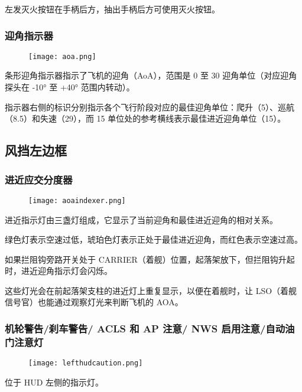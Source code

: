 左发灭火按钮在手柄后方，抽出手柄后方可使用灭火按钮。

\subsubsection{迎角指示器}

\begin{figure}[htb]
  \center
  \texttt{[image: aoa.png]}
\end{figure}
条形迎角指示器指示了飞机的迎角（AoA），范围是 0 至 30 迎角单位（对应迎角探头在 -10° 至 +40° 范围内转动）。

指示器右侧的标识分别指示各个飞行阶段对应的最佳迎角单位：爬升（5）、巡航（8.5）和失速（29），而 15 单位处的参考横线表示最佳进近迎角单位（15）。

\subsection{风挡左边框}

\subsubsection{进近应交分度器}

\begin{figure}[htb]
  \center
  \texttt{[image: aoaindexer.png]}
\end{figure}
进近指示灯由三盏灯组成，它显示了当前迎角和最佳进近迎角的相对关系。

绿色灯表示空速过低，琥珀色灯表示正处于最佳进近迎角，而红色表示空速过高。

如果拦阻钩旁路开关处于 CARRIER（着舰）位置，起落架放下，但拦阻钩升起时，进近迎角指示灯会闪烁。

这些灯光会在前起落架支柱的进近灯上重复显示，以便在着舰时，让 LSO（着舰信号官）也能通过观察灯光来判断飞机的 AOA。

\subsubsection{机轮警告/刹车警告/ ACLS 和 AP 注意/ NWS 启用注意/自动油门注意灯}

\begin{figure}[htb]
  \center
  \texttt{[image: lefthudcaution.png]}
\end{figure}
位于 HUD 左侧的指示灯。

